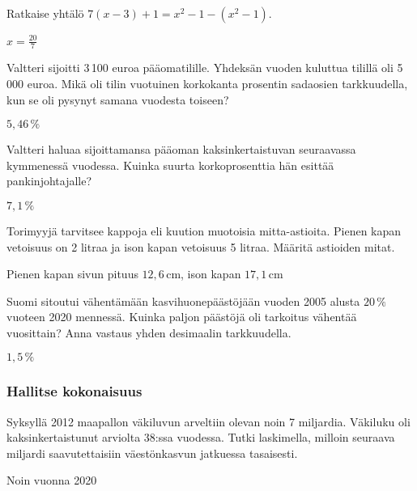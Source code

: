 \begin{tehtavasivu}
\begin{tehtava}
	Ratkaise yhtälö $7(x-3)+1=x^2-1-(x^2-1)$.
    \begin{vastaus}
	$x=\frac{20}{7}$
    \end{vastaus}
\end{tehtava}

\begin{tehtava}%
Valtteri sijoitti 3\,100 euroa pääomatilille. Yhdeksän vuoden kuluttua tilillä oli 5\,000 euroa. Mikä oli tilin vuotuinen korkokanta prosentin sadaosien tarkkuudella, kun se oli pysynyt samana vuodesta toiseen? 
\begin{vastaus}
$5,46\,\%$
\end{vastaus}
\end{tehtava}
\begin{tehtava}%
Valtteri haluaa sijoittamansa pääoman kaksinkertaistuvan seuraavassa kymmenessä vuodessa. Kuinka suurta korkoprosenttia hän esittää pankinjohtajalle?
\begin{vastaus}
$7,1\,\%$
\end{vastaus}
\end{tehtava}

\begin{tehtava}%
Torimyyjä tarvitsee kappoja eli kuution muotoisia mitta-astioita. Pienen kapan vetoisuus on 2 litraa ja ison kapan vetoisuus 5 litraa. Määritä astioiden mitat.
\begin{vastaus}
Pienen kapan sivun pituus $12,6$\,cm, ison kapan $17,1$\,cm
\end{vastaus}
\end{tehtava}

\begin{tehtava}%
Suomi sitoutui vähentämään kasvihuonepäästöjään vuoden 2005 alusta $20\,\%$ vuoteen 2020 mennessä. Kuinka paljon päästöjä oli tarkoitus vähentää vuosittain? Anna vastaus yhden desimaalin tarkkuudella. %
\begin{vastaus}
$1,5\,\%$
\end{vastaus}
\end{tehtava}

\subsubsection*{Hallitse kokonaisuus}
\begin{tehtava}%
Syksyllä 2012 maapallon väkiluvun arveltiin olevan noin 7 miljardia. Väkiluku oli kaksinkertaistunut arviolta 38:ssa vuodessa. Tutki laskimella, milloin seuraava miljardi saavutettaisiin väestönkasvun jatkuessa tasaisesti.
\begin{vastaus}
Noin vuonna 2020
\end{vastaus}
\end{tehtava}


\end{tehtavasivu}

